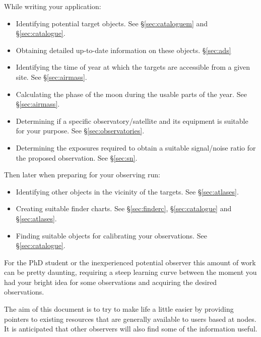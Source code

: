 While writing your application:

\begin{itemize}
\item Identifying potential target objects. See \S{\ref{sec:cataloguem}} and \S{\ref{sec:catalogue}}.

\item Obtaining detailed up-to-date information on these objects. \S{\ref{sec:ads}} 

\item Identifying the time of year at which the targets are accessible
      from a given site. See \S{\ref{sec:airmass}}.

\item Calculating the phase of the moon during the usable parts of the year. See 
      \S{\ref{sec:airmass}}.

\item Determining if a specific observatory/satellite and its 
      equipment is suitable for your purpose. See \S{\ref{sec:observatories}}.

\item Determining the exposures required to obtain
      a suitable signal/noise ratio for the proposed observation. See \S{\ref{sec:sn}}.
	
\end{itemize}

Then later when preparing for your observing run:

\begin{itemize}
\item Identifying other objects in the vicinity of the targets. See \S{\ref{sec:atlases}}.

\item Creating suitable finder charts. See \S{\ref{sec:finderc}}, \S{\ref{sec:catalogue}} and
      \S{\ref{sec:atlases}}.

\item Finding suitable objects for calibrating your observations. See \S{\ref{sec:catalogue}}.
\end{itemize}

For the PhD student or the inexperienced potential observer this amount of
work can be pretty daunting, requiring a steep learning curve between the
moment you had your bright idea for some observations and acquiring 
the desired observations.

The aim of this document is to try to make life a little easier by 
providing pointers to existing resources that are generally available 
to users based at {\STARLINKref} nodes. It is anticipated that other 
observers will also find some of the information useful. 

